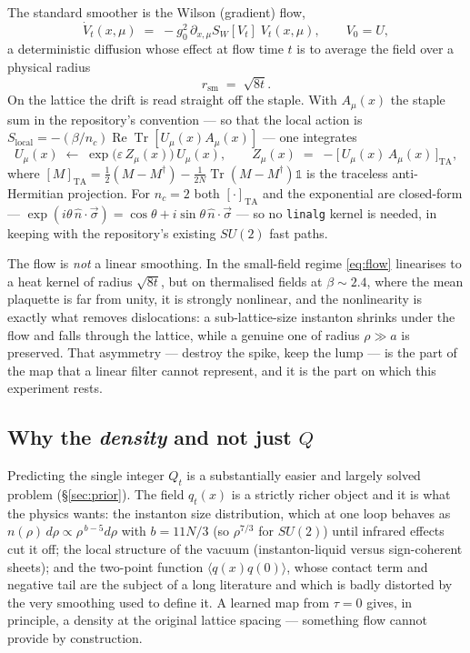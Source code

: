 \documentclass[11pt,a4paper]{article}
\newcommand{\Tr}{\operatorname{Tr}}
\newcommand{\qflow}{q_{t}}
\newcommand{\Qflow}{Q_{t}}
\newcommand{\TA}{\mathrm{TA}}
\begin{document}
The standard smoother is the Wilson (gradient) flow,
\begin{equation}
  \dot{V}_{t}(x,\mu) \;=\; -g_0^2\,\partial_{x,\mu} S_W\!\left[V_t\right]\; V_t(x,\mu),
  \qquad V_0 = U,
  \label{eq:flow}
\end{equation}
a deterministic diffusion whose effect at flow time $t$ is to average the field
over a physical radius
\begin{equation}
  r_{\mathrm{sm}} \;=\; \sqrt{8t}.
  \label{eq:rsm}
\end{equation}
On the lattice the drift is read straight off the staple. With
$A_{\mu}(x)$ the staple sum in the repository's convention --- so that the local
action is $S_{\mathrm{local}} = -(\beta/n_c)\operatorname{Re}\Tr[U_{\mu}(x) A_{\mu}(x)]$ ---
one integrates
\begin{equation}
  U_{\mu}(x) \;\longleftarrow\; \exp\!\big(\varepsilon\, Z_{\mu}(x)\big)\, U_{\mu}(x),
  \qquad
  Z_{\mu}(x) \;=\; -\Big[\,U_{\mu}(x)\,A_{\mu}(x)\,\Big]_{\TA},
  \label{eq:flowstep}
\end{equation}
where $[M]_{\TA} = \tfrac{1}{2}(M - M^{\dagger}) - \tfrac{1}{2N}\Tr(M - M^{\dagger})\mathbb{1}$
is the traceless anti-Hermitian projection. For $n_c = 2$ both $[\cdot]_{\TA}$
and the exponential are closed-form --- $\exp(i\theta\, \hat{n}\cdot\vec{\sigma})
= \cos\theta + i \sin\theta\, \hat{n}\cdot\vec{\sigma}$ --- so no \texttt{linalg}
kernel is needed, in keeping with the repository's existing
$SU(2)$ fast paths.

The flow is \emph{not} a linear smoothing. In the small-field regime
\eqref{eq:flow} linearises to a heat kernel of radius $\sqrt{8t}$, but on
thermalised fields at $\beta \sim 2.4$, where the mean plaquette is far from
unity, it is strongly nonlinear, and the nonlinearity is exactly what removes
dislocations: a sub-lattice-size instanton shrinks under the flow and falls
through the lattice, while a genuine one of radius $\rho \gg a$ is preserved.
That asymmetry --- destroy the spike, keep the lump --- is the part of the map
that a linear filter cannot represent, and it is the part on which this
experiment rests.

\subsection{Why the \emph{density} and not just \texorpdfstring{$Q$}{Q}}

Predicting the single integer $\Qflow$ is a substantially easier and largely
solved problem (\S\ref{sec:prior}). The field $\qflow(x)$ is a strictly richer
object and it is what the physics wants: the instanton size distribution, which
at one loop behaves as $n(\rho)\,d\rho \propto \rho^{\,b-5} d\rho$ with
$b = 11N/3$ (so $\rho^{7/3}$ for $SU(2)$) until infrared effects cut it off; the
local structure of the vacuum (instanton-liquid versus sign-coherent sheets); and
the two-point function $\langle q(x) q(0)\rangle$, whose contact term and
negative tail are the subject of a long literature and which is badly distorted
by the very smoothing used to define it. A learned map from $\tau = 0$ gives, in
principle, a density at the original lattice spacing --- something flow cannot
provide by construction.
\end{document}
